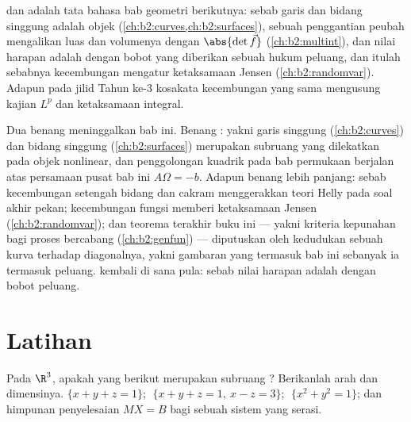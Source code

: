 \begin{remark}
 dan  adalah tata bahasa bab
geometri berikutnya: sebab garis dan bidang singgung adalah objek 
(\cref{ch:b2:curves,ch:b2:surfaces}), sebuah penggantian peubah
 mengalikan luas dan volumenya dengan
$\abs{\det \vec f}$ (\cref{ch:b2:multint}), dan nilai harapan
adalah  dengan bobot yang diberikan sebuah hukum peluang, dan itulah
sebabnya kecembungan mengatur ketaksamaan Jensen
(\cref{ch:b2:randomvar}). Adapun pada jilid Tahun ke-3 kosakata
kecembungan yang sama mengusung kajian  $L^p$ dan
ketaksamaan integral.
\end{remark}

\begin{remark}
Dua benang meninggalkan bab ini. Benang \emph{}: yakni
garis singgung (\cref{ch:b2:curves}) dan bidang singgung
(\cref{ch:b2:surfaces}) merupakan subruang  yang dilekatkan pada
objek nonlinear, dan penggolongan kuadrik pada bab
permukaan berjalan atas persamaan pusat bab ini
$A\Omega = -b$. Adapun benang \emph{} lebih panjang: sebab kecembungan
setengah bidang dan cakram menggerakkan teori Helly pada
soal akhir pekan; kecembungan fungsi memberi ketaksamaan Jensen
(\cref{ch:b2:randomvar}); dan teorema terakhir
buku ini --- yakni kriteria kepunahan bagi proses bercabang
(\cref{ch:b2:genfun}) --- diputuskan oleh kedudukan sebuah
kurva  terhadap diagonalnya, yakni gambaran yang termasuk
bab ini sebanyak ia termasuk peluang. 
kembali di sana pula: sebab nilai harapan adalah  dengan
bobot peluang.
\end{remark}

\section{Latihan}

\begin{exercise}[$\star$]\label{exo:b2:affine:1}
Pada $\R^3$, apakah yang berikut merupakan subruang ? Berikanlah arah dan
dimensinya. $\{x + y + z = 1\}$; $\;\{x + y + z = 1,\ x - z =
3\}$; $\;\{x^2 + y^2 = 1\}$; dan himpunan penyelesaian $MX = B$ bagi
sebuah sistem yang serasi.
\end{exercise}

